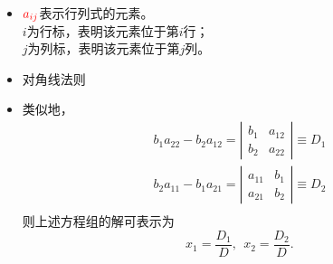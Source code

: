 \begin{frame}

    \begin{itemize}
    \item 
      $\textcolor{red}{a_{ij}}$表示行列式的元素。\\[0.2cm]
      $i$为行标，表明该元素位于第$i$行；\\[0.2cm]
      $j$为列标，表明该元素位于第$j$列。\\[0.4cm]
    \item
      对角线法则\\
      \begin{center}
      \end{center}
    \end{itemize}
\end{frame}

\begin{frame}

    \begin{itemize}
    \item 
      类似地，
      $$
      \begin{array}{l}
        b_1 a_{22} - b_2 a_{12} = \left|
        \begin{array}{cc}
          b_1 & a_{12} \\
          b_2 & a_{22} 
        \end{array}
        \right|  \equiv D_1\\[0.4cm]
        b_2 a_{11} - b_1 a_{21} = \left|
        \begin{array}{cc}
          a_{11} & b_1 \\
          a_{21} & b_2
        \end{array}
        \right|  \equiv D_2\\
      \end{array}
      $$      
      则上述方程组的解可表示为
      $$
      x_1 = \frac{D_1}{D},\ \
      x_2 = \frac{D_2}{D}.
      $$
    \end{itemize}


\end{frame}


